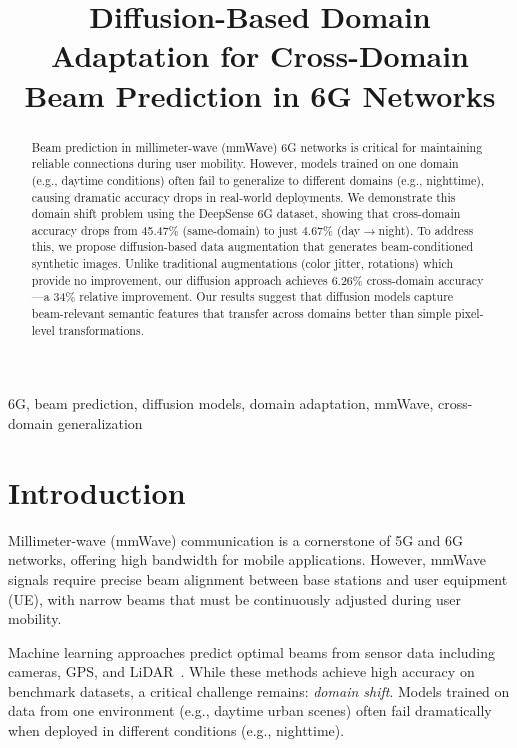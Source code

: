 \documentclass[conference]{IEEEtran}
\begin{document}
\title{Diffusion-Based Domain Adaptation for Cross-Domain Beam Prediction in 6G Networks}

\author{
}

\maketitle

\begin{abstract}
Beam prediction in millimeter-wave (mmWave) 6G networks is critical for maintaining reliable connections during user mobility. However, models trained on one domain (e.g., daytime conditions) often fail to generalize to different domains (e.g., nighttime), causing dramatic accuracy drops in real-world deployments. We demonstrate this domain shift problem using the DeepSense 6G dataset, showing that cross-domain accuracy drops from 45.47\% (same-domain) to just 4.67\% (day$\to$night). To address this, we propose diffusion-based data augmentation that generates beam-conditioned synthetic images. Unlike traditional augmentations (color jitter, rotations) which provide no improvement, our diffusion approach achieves 6.26\% cross-domain accuracy---a 34\% relative improvement. Our results suggest that diffusion models capture beam-relevant semantic features that transfer across domains better than simple pixel-level transformations.
\end{abstract}

\begin{IEEEkeywords}
6G, beam prediction, diffusion models, domain adaptation, mmWave, cross-domain generalization
\end{IEEEkeywords}

\section{Introduction}

Millimeter-wave (mmWave) communication is a cornerstone of 5G and 6G networks, offering high bandwidth for mobile applications. However, mmWave signals require precise beam alignment between base stations and user equipment (UE), with narrow beams that must be continuously adjusted during user mobility.

Machine learning approaches predict optimal beams from sensor data including cameras, GPS, and LiDAR~\cite{deepverse2023}. While these methods achieve high accuracy on benchmark datasets, a critical challenge remains: \textit{domain shift}. Models trained on data from one environment (e.g., daytime urban scenes) often fail dramatically when deployed in different conditions (e.g., nighttime).
\end{document}
